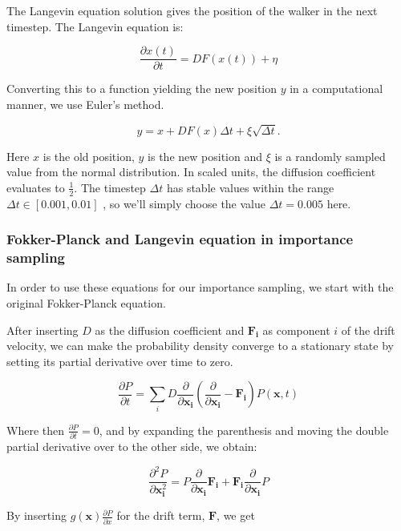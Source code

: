 \documentclass[
]{article}
\begin{document}
The Langevin equation solution gives the position of the walker in the
next timestep. The Langevin equation is:

\[ \frac{\partial x(t)}{\partial t}=D F(x(t))+\eta \]

Converting this to a function yielding the new position \(y\) in a
computational manner, we use Euler's method.

\begin{equation} y=x+D F(x) \Delta t+\xi \sqrt{\Delta t} .\label{eq:euler_method}\end{equation}

Here \(x\) is the old position, \(y\) is the new position and \(\xi\) is
a randomly sampled value from the normal distribution. In scaled units,
the diffusion coefficient evaluates to \(\frac{1}{2}\). The timestep
\(\Delta t\) has stable values within the range
\(\Delta t \in [0.001, 0.01]\) , so we'll simply choose the value
\(\Delta t = 0.005\) here.

\hypertarget{fokker-planck-and-langevin-equation-in-importance-sampling}{%
\subsubsection{Fokker-Planck and Langevin equation in importance
sampling}\label{fokker-planck-and-langevin-equation-in-importance-sampling}}

In order to use these equations for our importance sampling, we start
with the original Fokker-Planck equation.

After inserting \(D\) as the diffusion coefficient and
\(\mathbf{F}_{\mathbf{i}}\) as component \(i\) of the drift velocity, we
can make the probability density converge to a stationary state by
setting its partial derivative over time to zero.

\[ \frac{\partial P}{\partial t}=\sum_{i} D \frac{\partial}{\partial \mathbf{x}_{\mathbf{i}}}\left(\frac{\partial}{\partial \mathbf{x}_{\mathbf{i}}}-\mathbf{F}_{\mathbf{i}}\right) P(\mathbf{x}, t) \]

Where then \(\frac{\partial P}{\partial t}= 0\), and by expanding the
parenthesis and moving the double partial derivative over to the other
side, we obtain:

\[ \frac{\partial^{2} P}{\partial \mathbf{x}_{\mathbf{i}}^{2}}=P \frac{\partial}{\partial \mathbf{x}_{\mathbf{i}}} \mathbf{F}_{\mathbf{i}}+\mathbf{F}_{\mathbf{i}} \frac{\partial}{\partial \mathbf{x}_{\mathbf{i}}} P \]

By inserting \(g(\mathbf{x}) \frac{\partial P}{\partial x}\) for the
drift term, \(\mathbf{F}\), we get
\end{document}
